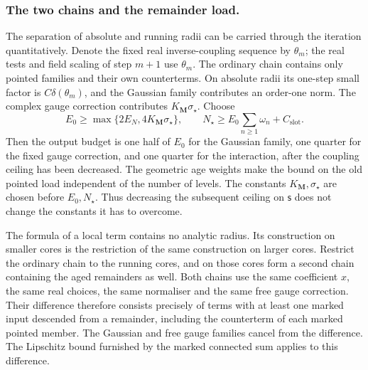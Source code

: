 \documentclass[11pt,letterpaper,reqno]{amsart}
\theoremstyle{definition}
\theoremstyle{remark}
\begin{document}
\subsubsection*{The two chains and the remainder load.}
The separation of absolute and running radii can be carried
through the iteration quantitatively. Denote the fixed real
inverse-coupling sequence by $\theta_m$; the real tests and
field scaling of step $m+1$ use $\theta_m$. The ordinary
chain contains only pointed families and their own
counterterms. On absolute radii its one-step small factor is
$C\delta(\theta_m)$, and the Gaussian family contributes an
order-one norm. The complex gauge correction contributes
$K_{\mathbf M}\sigma_\star$. Choose
\[
 E_0\ge\max\{2E_N,4K_{\mathbf M}\sigma_\star\},\qquad
 N_\star\ge E_0\sum_{n\ge1}\omega_n+C_{\mathrm{slot}}.
\]
Then the output budget is one half of $E_0$ for the
Gaussian family, one quarter for the fixed gauge correction,
and one quarter for the interaction, after the coupling
ceiling has been decreased. The geometric age weights make
the bound on the old pointed load independent of the number
of levels. The constants $K_{\mathbf M},\sigma_\star$ are
chosen before $E_0,N_\star$. Thus decreasing the subsequent
ceiling on $\mathsf s$ does not change the constants it has
to overcome.

The formula of a local term contains no analytic radius.
Its construction on smaller cores is the restriction of
the same construction on larger cores. Restrict the ordinary
chain to the running cores, and on those cores form a
second chain containing the aged remainders as well. Both
chains use the same coefficient $x$, the same real choices,
the same normaliser and the same free gauge correction.
Their difference therefore consists precisely of terms with
at least one marked input descended from a remainder,
including the counterterm of each marked pointed member.
The Gaussian and free gauge families cancel from the
difference. The Lipschitz bound furnished by the marked
connected sum applies to this difference.
\end{document}
